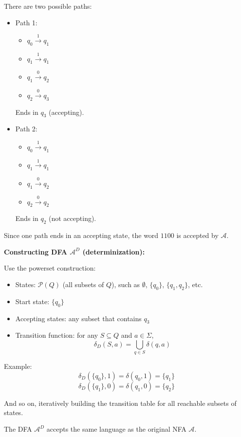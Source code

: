 \documentclass{article}
\theoremstyle{theorem}
\theoremstyle{definition}
\theoremstyle{remark}
\begin{document}
There are two possible paths:
\begin{itemize}
\item Path 1:
    \begin{itemize}
        \item $q_0 \xrightarrow{1} q_1$
        \item $q_1 \xrightarrow{1} q_1$
        \item $q_1 \xrightarrow{0} q_2$
        \item $q_2 \xrightarrow{0} q_3$
    \end{itemize}
    Ends in $q_3$ (accepting).

\item Path 2:
    \begin{itemize}
        \item $q_0 \xrightarrow{1} q_1$
        \item $q_1 \xrightarrow{1} q_1$
        \item $q_1 \xrightarrow{0} q_2$
        \item $q_2 \xrightarrow{0} q_2$
    \end{itemize}
    Ends in $q_2$ (not accepting).
\end{itemize}

Since one path ends in an accepting state, the word $1100$ is accepted by $\mathcal{A}$.

\bigskip

\textbf{Constructing DFA $\mathcal{A}^D$ (determinization):}

Use the powerset construction:

\begin{itemize}
    \item States: $\mathcal{P}(Q)$ (all subsets of $Q$), such as $\emptyset$, $\{q_0\}$, $\{q_1, q_2\}$, etc.
    \item Start state: $\{q_0\}$
    \item Accepting states: any subset that contains $q_3$
    \item Transition function: for any $S \subseteq Q$ and $a \in \Sigma$,
    \[
    \delta_D(S, a) = \bigcup_{q \in S} \delta(q, a)
    \]
\end{itemize}

Example:
\[
\delta_D(\{q_0\}, 1) = \delta(q_0, 1) = \{q_1\}
\]
\[
\delta_D(\{q_1\}, 0) = \delta(q_1, 0) = \{q_2\}
\]

And so on, iteratively building the transition table for all reachable subsets of states.

The DFA $\mathcal{A}^D$ accepts the same language as the original NFA $\mathcal{A}$.
\end{document}
